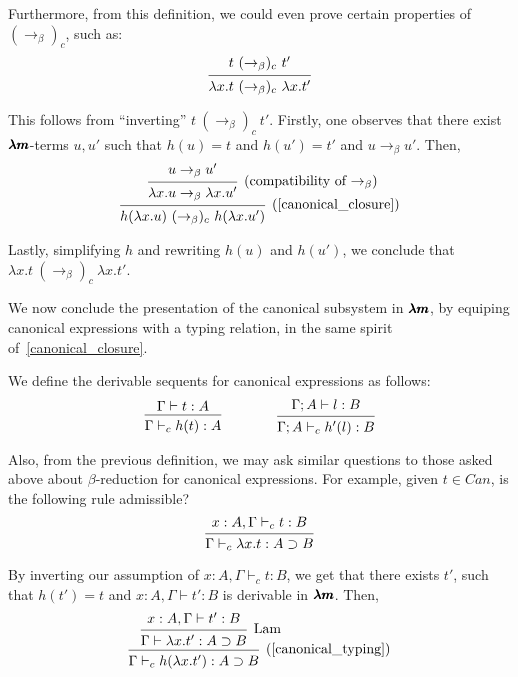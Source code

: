Furthermore, from this definition, we could even prove certain properties of $(\to_\beta)_c$, such as:
\[ \begin{prooftree}
    \hypo{ t \ (\to_\beta)_c \ t' }
    \infer1{ \lambda x.t \ (\to_\beta)_c \ \lambda x.t' }.
  \end{prooftree} \]

This follows from ``inverting'' $t \ (\to_\beta)_c \ t'$.
Firstly, one observes that there exist $\pmb{\lambda m}$-terms $u, u'$ such that $h(u) = t$ and $h(u') = t'$ and $u \to_\beta u'$.
Then, 
\[ \begin{prooftree}
    \hypo{ u \to_\beta u' }
    \infer1[\text{(compatibility of $\to_\beta$)}]{ \lambda x.u \to_\beta \lambda x.u' }
    \infer1[\text{(\cref{canonical_closure})}]{ h(\lambda x.u) \ (\to_\beta)_c \ h(\lambda x.u') }
  \end{prooftree} \]

Lastly, simplifying $h$ and rewriting $h(u)$ and $h(u')$, we conclude that $\lambda x.t \ (\to_\beta)_c \ \lambda x.t'$.

We now conclude the presentation of the canonical subsystem in $\pmb{\lambda m}$, by equiping canonical expressions with a typing relation, in the same spirit of~\cref{canonical_closure}.

\begin{definition}
  \label{canonical_typing}
  We define the derivable sequents for canonical expressions as follows:
  \[
    \begin{prooftree}
      \hypo{ \Gamma \vdash t:A }
      \infer1{ \Gamma \vdash_c h(t):A } 
    \end{prooftree}
    \qquad \qquad
    \begin{prooftree}
      \hypo{ \Gamma ; A \vdash l:B }
      \infer1{ \Gamma ; A \vdash_c h'(l):B }.
    \end{prooftree}
  \]
\end{definition}

Also, from the previous definition, we may ask similar questions to those asked above about $\beta$-reduction for canonical expressions.
For example, given $t \in Can$, is the following rule admissible?
\[
  \begin{prooftree}
    \hypo{ x:A, \Gamma \vdash_c t:B }
    \infer1{ \Gamma \vdash_c \lambda x.t : A \supset B } 
  \end{prooftree}
\]

By inverting our assumption of $x:A, \Gamma \vdash_c t:B$, we get that there exists $t'$, such that $h(t') = t$ and $x:A, \Gamma \vdash t':B$ is derivable in $\pmb{\lambda m}$. Then,
\[
  \begin{prooftree}
    \hypo{ x:A, \Gamma \vdash t':B }
    \infer1[Lam]{ \Gamma \vdash \lambda x . t' : A \supset B }
    \infer1[\text{(\cref{canonical_typing})}]{ \Gamma \vdash_c h(\lambda x . t') : A \supset B }
  \end{prooftree}
\]

